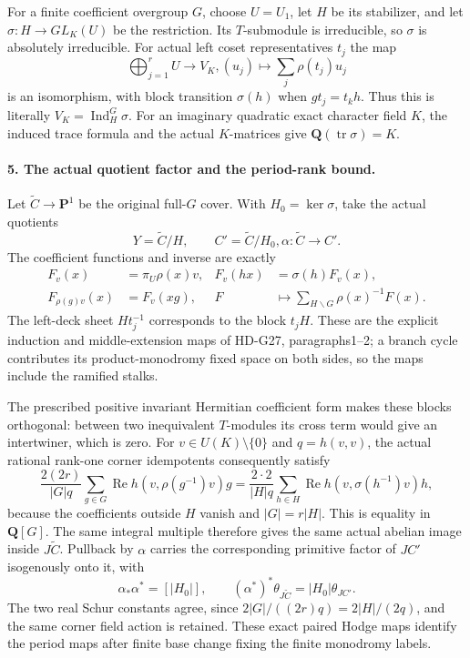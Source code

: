 For a finite coefficient overgroup \(G\), choose
\(U=U_1\), let \(H\) be its stabilizer, and let
\(\sigma:H\to GL_K(U)\) be the restriction. Its
\(T\)-submodule is irreducible, so \(\sigma\) is
absolutely irreducible. For actual left coset representatives
\(t_j\) the map
\[
        \bigoplus_{j=1}^rU\longrightarrow V_K,
                  (u_j)\longmapsto\sum_j\rho(t_j)u_j
                                                               \tag{G29.11}
\]
is an isomorphism, with block transition \(\sigma(h)\)
when \(gt_j=t_kh\). Thus this is literally
\(V_K=\operatorname{Ind}_H^G\sigma\).
For an imaginary quadratic exact character field \(K\),
the induced trace formula and the actual \(K\)-matrices
give \(\mathbf Q(\operatorname{tr}\sigma)=K\).

\paragraph{5. The actual quotient factor and the period-rank bound.}
Let \(\widetilde C\to\mathbf P^1\) be the original
full-\(G\) cover. With \(H_0=\ker\sigma\), take
the actual quotients
\[
       Y=\widetilde C/H,\qquad C'=\widetilde C/H_0,
                         \alpha:\widetilde C\to C'.        \tag{G29.12}
\]
The coefficient functions and inverse are exactly
\[
 \begin{aligned}
 F_v(x)&=\pi_U\rho(x)v,&
 F_v(hx)&=\sigma(h)F_v(x),\\
 F_{\rho(g)v}(x)&=F_v(xg),&
 F&\longmapsto\sum_{H\backslash G}\rho(x)^{-1}F(x).
 \end{aligned}                                              \tag{G29.13}
\]
The left-deck sheet \(Ht_j^{-1}\) corresponds to the block
\(t_jH\). These are the explicit induction and
middle-extension maps of HD-G27, paragraphs1--2; a branch
cycle contributes its product-monodromy fixed space on both
sides, so the maps include the ramified stalks.

The prescribed positive invariant Hermitian coefficient form
makes these blocks orthogonal: between two inequivalent
\(T\)-modules its cross term would give an intertwiner,
which is zero. For \(v\in U(K)\setminus\{0\}\) and
\(q=h(v,v)\), the actual rational rank-one corner
idempotents consequently satisfy
\[
 \frac{2(2r)}{|G|q}\sum_{g\in G}
       \operatorname{Re}h(v,\rho(g^{-1})v)g
   =\frac{2\cdot2}{|H|q}\sum_{h\in H}
       \operatorname{Re}h(v,\sigma(h^{-1})v)h,              \tag{G29.14}
\]
because the coefficients outside \(H\) vanish and
\(|G|=r|H|\). This is equality in \(\mathbf Q[G]\).
The same integral multiple therefore gives the same actual
abelian image inside \(J\widetilde C\). Pullback by
\(\alpha\) carries the corresponding primitive factor
of \(JC'\) isogenously onto it, with
\[
       \alpha_*\alpha^*=[|H_0|],\qquad
       (\alpha^*)^*\theta_{J\widetilde C}
                                      =|H_0|\theta_{JC'}.
                                                               \tag{G29.15}
\]
The two real Schur constants agree, since
\(2|G|/((2r)q)=2|H|/(2q)\), and the same corner
field action is retained. These exact paired Hodge maps
identify the period maps after finite base change fixing
the finite monodromy labels.

